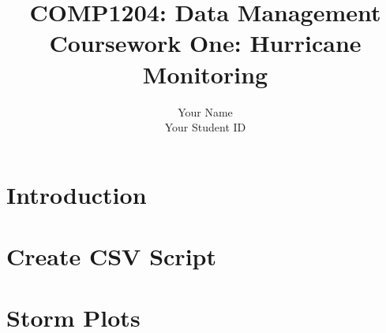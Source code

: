 \documentclass[]{article}
\title{COMP1204: Data Management \\ Coursework One: Hurricane Monitoring }
\author{Your Name \\ Your Student ID}
\begin{document}
\maketitle

\section{Introduction}

\section{Create CSV Script}

\section{Storm Plots}
\end{document}
